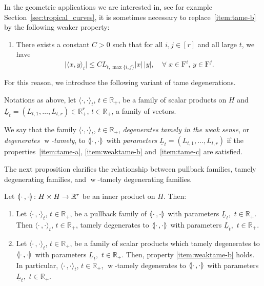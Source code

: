 \documentclass[AHL,Unicode,longabstracts]{cedram}
\newcommand{\innone}[2]{{\langle#2\rangle_{#1}}}
\newcommand{\llangle}{\mathopen{\langle\mkern -3.1mu\lvert}}
\newcommand{\rrangle}{\mathclose{\rvert\mkern -3.1mu\rangle}}
\newcommand{\highinn}[2]{{\llangle#2\rrangle_{#1}}}
\newcommand{\refnorm}[1]{\lvert#1\rvert}
\newcommand{\abs}[1]{\lvert #1\rvert}
\DeclareMathOperator{\weak}{w}
\newcommand{\filter}{\mathrm{F}}
\newcommand{\R}{\mathbb{R}}
\renewcommand*{\to}{\mathchoice{\longrightarrow}{\rightarrow}{\rightarrow}{\rightarrow}}
\newcommand*{\relabel}{\renewcommand{\labelenumi}{(\theenumi)}}
\newcommand*{\romanenumi}{\renewcommand*{\theenumi}{\roman{enumi}}\relabel}
\newcommand*{\alphebisnumi}{\renewcommand*{\theenumi}{\alph{enumi}$'$}\relabel}
\let\oldforall\forall
\renewcommand*{\forall}{\mathrel{\oldforall}}
\begin{document}
In the geometric applications we are interested in, see for example Section~\ref{sec:tropical_curves}, it is sometimes necessary to replace~\eqref{item:tame-b} by the following weaker property:
\begin{enumerate}\alphebisnumi
\setcounter{enumi}{1}
\item \label{item:weaktame-b}
There exists a constant $C>0$ such that for all $i, j \in [r]$ and all large $t$, we have
\begin{equation}\label{eq:WeakTameEstimate}
\abs{\innone{t}{x, y} } \le C L_{t, \max\{i,j\}} \refnorm{x}\, \refnorm{y}, \quad \forall\; x \in \filter^i,\, y \in \filter^j.
\end{equation}
\end{enumerate}
For this reason, we introduce the following variant of tame degenerations.

\begin{defi}[$\weak$-tame degeneration]
Notations as above,
let $\innone{t}{\cdot, \cdot}$, $t\in \R_+$, be a family of scalar products on $H$ and $\underline L_t = (L_{t,1}, \dots, L_{t,r}) \in \R_+^r$, $t\in \R_+$, a family of vectors.

We say that the family $\innone{t}{\cdot, \cdot}$, $t\in \R_+$, \emph{degenerates tamely in the weak sense}, or \emph{degenerates $\weak$-tamely}, to $\highinn{}{\cdot\,, \cdot}$ with \emph{parameters} $\underline L_t = (L_{t,1}, \dots, L_{t,r})$ if the properties~\eqref{item:tame-a}, \eqref{item:weaktame-b} and~\eqref{item:tame-c} are satisfied.%
\end{defi}



The next proposition clarifies the relationship between pullback families, tamely degenerating families, and $\weak$-tamely degenerating families.

\begin{prop}\label{prop:tameness_basic_family}
Let $\highinn{}{\cdot \,, \cdot} \colon H \times H \to \R^r$ be an inner product on $H$. Then:
\begin{enumerate}\romanenumi
\item\label{prop5.4.1} Let $\innone{t}{\cdot\,,\cdot}$, $t \in \R_+$, be a pullback family of $\highinn{}{\cdot \,, \cdot}$ with parameters $\underline L_t,$ $t \in \R_+$. Then $\innone{t}{\cdot\,,\cdot}$, $t \in \R_+$, tamely degenerates to $\highinn{}{\cdot \,, \cdot}$ with parameters $\underline L_t,$ $t \in \R_+$.
\item\label{prop5.4.2} Let $\innone{t}{\cdot\,,\cdot}$, $t \in \R_+$, be a family of scalar products which tamely degenerates to $\highinn{}{\cdot \,, \cdot}$ with parameters $\underline L_t,$ $t \in \R_+$. Then, property \eqref{item:weaktame-b} holds. In particular, $\innone{t}{\cdot\,,\cdot}$, $t \in \R_+$, $\weak$-tamely degenerates to $\highinn{}{\cdot \,, \cdot}$ with parameters $\underline L_t,$ $t \in \R_+$.
\end{enumerate}
\end{prop}
\end{document}

